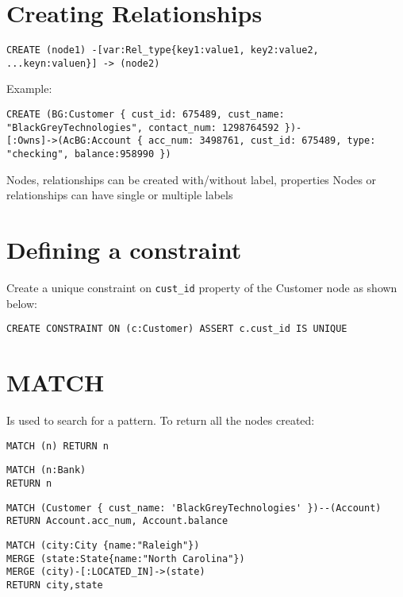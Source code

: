\documentclass[../main.tex]{subfiles}
\begin{document}
\section{Creating Relationships}
\begin{lstlisting}[language=cypher, caption={Create Relationships}]
CREATE (node1) -[var:Rel_type{key1:value1, key2:value2, ...keyn:valuen}] -> (node2)
\end{lstlisting}
Example: 
\begin{lstlisting}[language=cypher, caption={Create Relation Example}]
CREATE (BG:Customer { cust_id: 675489, cust_name: "BlackGreyTechnologies", contact_num: 1298764592 })-
[:Owns]->(AcBG:Account { acc_num: 3498761, cust_id: 675489, type: "checking", balance:958990 })
\end{lstlisting}
Nodes, relationships can be created with/without label, properties
Nodes or relationships can have single or multiple labels
\section{Defining a constraint}
Create a unique constraint on \lstinline{cust_id} property of the Customer node as shown below:
\begin{lstlisting}[language=cypher, caption={constraint}]
CREATE CONSTRAINT ON (c:Customer) ASSERT c.cust_id IS UNIQUE
\end{lstlisting}
\section{MATCH}
Is used to search for a pattern.
To return all the nodes created:
\begin{lstlisting}[language=cypher, caption={Match syntax}]
MATCH (n) RETURN n
\end{lstlisting}

\begin{lstlisting}[language=cypher, caption={Match example}]
MATCH (n:Bank) 
RETURN n 
\end{lstlisting}

\begin{lstlisting}[language=cypher, caption={Match example}]
MATCH (Customer { cust_name: 'BlackGreyTechnologies' })--(Account)
RETURN Account.acc_num, Account.balance
\end{lstlisting}

\begin{lstlisting}[language=cypher, caption={Match example}]
MATCH (city:City {name:"Raleigh"})
MERGE (state:State{name:"North Carolina"})
MERGE (city)-[:LOCATED_IN]->(state)
RETURN city,state
\end{lstlisting}
\end{document}
